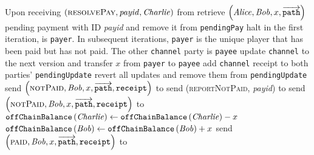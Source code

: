 \begin{functionality}{\fpaynet}
\begin{algorithmic}[1]
    \State Upon receiving $\left(\textsc{resolvePay}, \mathit{payid},
    \mathit{Charlie}\right)$ from \simulator
    \Indent
      \State retrieve $\left(\mathit{Alice}, \mathit{Bob}, x,
      \overrightarrow{\mathtt{path}}\right)$ pending payment with ID
      \textit{payid} and remove it from \texttt{pendingPay}
        \State halt 
        \State {}
      \Else
          \State in the first iteration, \charlie is \texttt{payer}. In
          subsequent iterations, \texttt{payer} is the unique player that has
          been paid but has not paid. The other \texttt{channel} party is
          \texttt{payee}
            \State update \texttt{channel} to the next version and transfer $x$
            from \texttt{payer} to \texttt{payee}
            \State add \texttt{channel} receipt to both parties'
            \texttt{pendingUpdate}
          \Else
            \State revert all updates and remove them from
            \texttt{pendingUpdate}
            \State {}
              \State send $\left(\textsc{notPaid}, \mathit{Bob}, x,
              \overrightarrow{\mathtt{path}}, \mathtt{receipt}\right)$ to \alice
            \Else
              \State send (\textsc{reportNotPaid}, \textit{payid}) to
              \simulator {}
                \State send $\left(\textsc{notPaid}, \mathit{Bob}, x,
                \overrightarrow{\mathtt{path}}, \mathtt{receipt}\right)$ to
                \alice
              \EndIf
            \EndIf
            \State {}
          \EndIf
        \EndFor
        \State $\mathtt{offChainBalance}\left(\mathit{Charlie}\right) \gets
        \mathtt{offChainBalance}\left(\mathit{Charlie}\right) - x$
        \State $\mathtt{offChainBalance}\left(\mathit{Bob}\right) \gets
        \mathtt{offChainBalance}\left(\mathit{Bob}\right) + x$
        \If{\charlie{} = \alice}
          \State send $\left(\textsc{paid}, \mathit{Bob}, x,
          \overrightarrow{\mathtt{path}}, \mathtt{receipt}\right)$ to \alice
        \EndIf
      \EndIf
    \EndIndent
    \State


\end{algorithmic}
\end{functionality}
